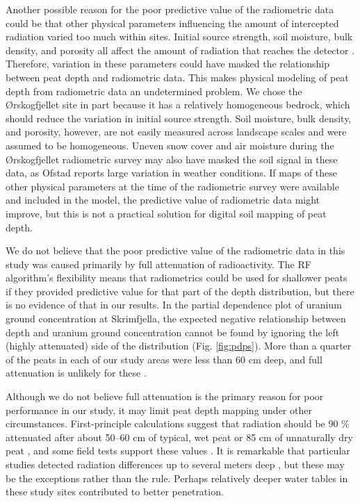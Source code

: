 \documentclass[soil, manuscript]{copernicus}
\begin{document}
Another possible reason for the poor predictive value of the radiometric data could be that other physical parameters influencing the amount of intercepted radiation varied too much within sites.
Initial source strength, soil moisture, bulk density, and porosity all affect the amount of radiation that reaches the detector \citep{beamishGammaRayAttenuation2013, reinhardtGammaraySpectrometryVersatile2019}.
Therefore, variation in these parameters could have masked the relationship between peat depth and radiometric data.
This makes physical modeling of peat depth from radiometric data an undetermined problem.
We chose the Ørskogfjellet site in part because it has a relatively homogeneous bedrock, which should reduce the variation in initial source strength.
Soil moisture, bulk density, and porosity, however, are not easily measured across landscape scales and were assumed to be homogeneous.
Uneven snow cover and air moisture during the Ørskogfjellet radiometric survey may also have masked the soil signal in these data, as Ofstad \citeyearpar{ofstadHelicopterborneMagneticRadiometric2015} reports large variation in weather conditions.
If maps of these other physical parameters at the time of the radiometric survey were available and included in the model, the predictive value of radiometric data might improve, but this is not a practical solution for digital soil mapping of peat depth.

We do not believe that the poor predictive value of the radiometric data in this study was caused primarily by full attenuation of radioactivity.
The RF algorithm's flexibility means that radiometrics could be used for shallower peats if they provided predictive value for that part of the depth distribution, but there is no evidence of that in our results.
In the partial dependence plot of uranium ground concentration at Skrimfjella, the expected negative relationship between depth and uranium ground concentration cannot be found by ignoring the left (highly attenuated) side of the distribution (Fig. \ref{fig:pdps}).
More than a quarter of the peats in each of our study areas were less than 60 cm deep, and full attenuation is unlikely for these \citep{beamishGammaRayAttenuation2013}.

Although we do not believe full attenuation is the primary reason for poor performance in our study, it may limit peat depth mapping under other circumstances.
First-principle calculations suggest that radiation should be 90 \% attenuated after about 50--60 cm of typical, wet peat or 85 cm of unnaturally dry peat \citep{beamishGammaRayAttenuation2013, beamishDetailedMappingPeat2024}, and some field tests support these values \citep{billenEignungGammaspektrometrieKartieren2015}.
It is remarkable that particular studies detected radiation differences up to several meters deep \citep{gatisMappingUplandPeat2019, kogantiMappingPeatDepth2023}, but these may be the exceptions rather than the rule.
Perhaps relatively deeper water tables in these study sites \citep[blanket bog, drained fen,][]{pricePeatlandRestorationHydrology2016} contributed to better penetration.
\end{document}
